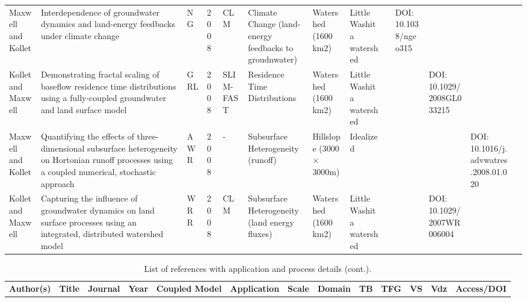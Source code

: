 {\begin{table}
\begin{tabular}{ p{1cm} p{2cm} p{0.75cm} p{0.5cm} p{1cm} p{1.5cm} p{1cm} p{1cm} p{0.25cm} p{0.25cm} p{0.25cm} p{0.25cm} p{1cm} }
Maxwell and Kollet & Interdependence of groundwater dynamics and land-energy feedbacks under climate change & NG & 2008 & CLM & Climate Change (land-energy feedbacks to groudnwater) & Watershed (1600 km2) & Little Washita watershed &  & DOI: 10.1038/ngeo315 \\
Kollet and Maxwell & Demonstrating fractal scaling of baseflow residence time distributions using a fully-coupled groundwater and land surface model & GRL & 2008 & SLIM-FAST & Residence Time Distributions  & Watershed (1600 km2) & Little Washita watershed &  &  & DOI: 10.1029/2008GL033215  \\
Maxwell and Kollet & Quantifying the effects of three-dimensional subsurface heterogeneity on Hortonian runoff processes using a coupled numerical, stochastic approach & AWR & 2008 & - & Subsurface Heterogeneity (runoff) & Hillslope (3000  × 3000m) & Idealized &  &  &  & DOI: 10.1016/j.advwatres.2008.01.020 \\
Kollet and Maxwell & Capturing the influence of groundwater dynamics on land surface processes using an integrated, distributed watershed model & WRR & 2008 & CLM & Subsurface Heterogeneity (land energy fluxes) & Watershed (1600 km2) & Little Washita watershed &  &  & DOI: 10.1029/2007WR006004 \\
\end{tabular}
\label{pfref3}
\end{table}

\begin{table} \center
\caption{List of \parflow{} references with application and process details (cont.).}

\begin{tabular}{ p{1cm} p{2cm} p{0.75cm} p{0.5cm} p{1cm} p{1.5cm} p{1cm} p{1cm} p{0.25cm} p{0.25cm} p{0.25cm} p{0.25cm} p{1cm} }
\bf{Author(s)} & \bf{Title} & \bf{Journal} & \bf{Year} & \bf{Coupled Model} & \bf{Application} & \bf{Scale} & \bf{Domain} & \bf{TB} & \bf{TFG} & \bf{VS} & \bf{Vdz} & \bf{Access/DOI} \\   


\end{tabular}
\end{table}}
